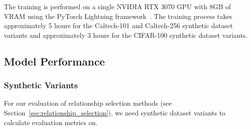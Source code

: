 The training is performed on a single NVIDIA RTX 3070 GPU with 8GB of VRAM
using the PyTorch Lightning framework~\cite{falcon_pytorch_2019}.
The training process takes approximately 5 hours for the Caltech-101 and Caltech-256
synthetic dataset variants and approximately 3 hours for the CIFAR-100 synthetic dataset variants.

\subsection{Model Performance}

\subsubsection{Synthetic Variants}

For our evaluation of relationship selection methods (see Section~\ref{sec:relationship_selection}),
we need synthetic dataset variants to calculate evaluation metrics on.

